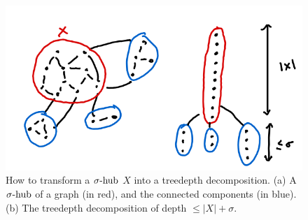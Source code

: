 \begin{figure}
    \centering
    \includegraphics[width=.6\textwidth]{figures/shub-to-treedepth.png}
    \caption{How to transform a $\sigma\text{-hub}$ $X$ into a treedepth decomposition. (a) A $\sigma\text{-hub}$ of a graph (in red), and the connected components (in blue). (b) The treedepth decomposition of depth $\leq |X| + \sigma$.}
    \label{fig:shub-to-treedepth}
\end{figure}